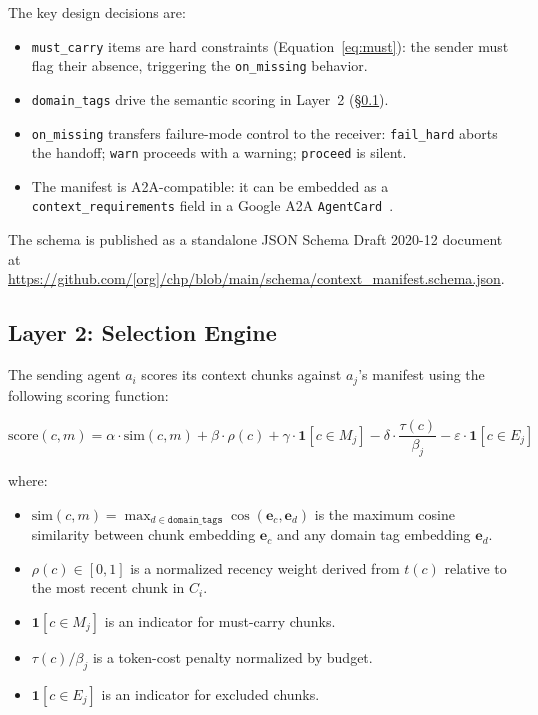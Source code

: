 \documentclass[11pt]{article}
\begin{document}
The key design decisions are:

\begin{itemize}
  \item \texttt{must\_carry} items are hard constraints (Equation~\ref{eq:must}):
    the sender must flag their absence, triggering the \texttt{on\_missing}
    behavior.
  \item \texttt{domain\_tags} drive the semantic scoring in
    Layer~2 (\S\ref{sec:scorer}).
  \item \texttt{on\_missing} transfers failure-mode control to the receiver:
    \texttt{fail\_hard} aborts the handoff; \texttt{warn} proceeds with a
    warning; \texttt{proceed} is silent.
  \item The manifest is A2A-compatible: it can be embedded as a
    \texttt{context\_requirements} field in a Google A2A
    \texttt{AgentCard}~\cite{google_a2a_2025}.
\end{itemize}

The schema is published as a standalone JSON Schema Draft 2020-12 document
at \url{https://github.com/[org]/chp/blob/main/schema/context_manifest.schema.json}.

\subsection{Layer 2: Selection Engine}
\label{sec:scorer}

The sending agent $a_i$ scores its context chunks against $a_j$'s manifest
using the following scoring function:

\begin{equation}
  \mathrm{score}(c, m) =
    \alpha \cdot \mathrm{sim}(c, m)
  + \beta \cdot \rho(c)
  + \gamma \cdot \mathbf{1}[c \in M_j]
  - \delta \cdot \frac{\tau(c)}{\beta_j}
  - \varepsilon \cdot \mathbf{1}[c \in E_j]
  \label{eq:score}
\end{equation}

where:
\begin{itemize}
  \item $\mathrm{sim}(c, m) = \max_{d \in \mathtt{domain\_tags}}
    \cos(\mathbf{e}_c, \mathbf{e}_d)$ is the maximum cosine similarity
    between chunk embedding $\mathbf{e}_c$ and any domain tag embedding
    $\mathbf{e}_d$.
  \item $\rho(c) \in [0,1]$ is a normalized recency weight derived from
    $t(c)$ relative to the most recent chunk in $C_i$.
  \item $\mathbf{1}[c \in M_j]$ is an indicator for must-carry chunks.
  \item $\tau(c)/\beta_j$ is a token-cost penalty normalized by budget.
  \item $\mathbf{1}[c \in E_j]$ is an indicator for excluded chunks.
\end{itemize}
\end{document}
